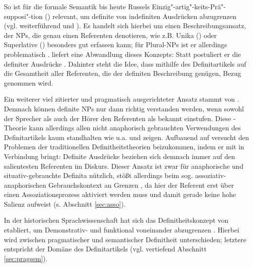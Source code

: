 So ist für die formale Semantik bis heute Russels Einzig"-artig"-keits-Prä"-supposi"-tion () relevant, um definite  von indefiniten  Ausdrücken abzugrenzen (vgl. weiterführend \citealt{Russel1905} und \citealt{Heim1991,Heim2011}). Es handelt sich hierbei um einen Beschreibungsansatz, der  NPs, die genau einen Referenten denotieren, wie z.B. Unika  () oder  Superlative () besonders gut erfassen kann; für  Plural-NPs   ist er allerdings problematisch \parencite[vgl. die Diskussion hierzu in][7--11] {Lyons1999}. \textcite{Hawkins1978} liefert eine Abwandlung dieses Konzepts: Statt  postuliert er die  definiter Ausdrücke  \parencite[kritisch hierzu:][32]{Bisle-Muller1991}. Dahinter steht die Idee, dass mithilfe des Definitartikels  auf die Gesamtheit aller Referenten, die der definiten Beschreibung genügen, Bezug genommen wird.

Ein weiterer viel zitierter und pragmatisch ausgerichteter Ansatz stammt von \textcite{Christophersen1939}. Demnach können definite NPs  nur dann richtig verstanden werden, wenn sowohl der Sprecher als auch der Hörer den Referenten als bekannt einstufen. Diese -Theorie kann allerdings allen nicht anaphorisch  gebrauchten Verwendungen des Definitartikels  kaum standhalten wie u.a. \textcite{Hawkins1978} und \textcite{Lobner1985} zeigen. Aufbauend auf \textcite{Lewis1970} versucht \textcite{vonHeusinger1996} den Problemen der traditionellen Definitheitstheorien beizukommen, indem er  mit  in Verbindung bringt: Definite Ausdrücke beziehen sich demnach immer auf den salientesten Referenten im Diskurs. Dieser Ansatz ist zwar für anaphorische  und situativ-gebrauchte  Definita nützlich, stößt allerdings beim sog. assoziativ-anaphorischen  Gebrauchskontext an Grenzen \parencite[s. auch][144--149]{Cui2014}, da hier der Referent erst über einen Assoziationsprozess aktiviert werden muss und damit gerade keine hohe Salienz aufweist (s. Abschnitt \ref{sec:asso}).

In der historischen Sprachwissenschaft hat sich das Definitheitskonzept von \textcite{Lobner1985} etabliert, um Demonstrativ-  und  funktional voneinander abzugrenzen \parencite{Demske2001,Szczepaniak2011a,Schlachter2015}. Hierbei wird zwischen pragmatischer  und semantischer Definitheit  unterschieden; letztere entspricht der Domäne des Definitartikels (vgl. vertiefend Abschnitt \ref{sec:pragsem}). 


